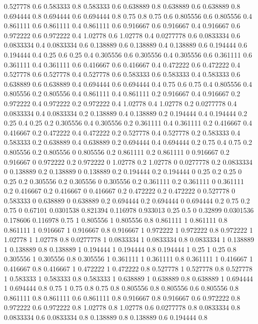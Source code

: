 0.527778 0.6
0.583333 0.8
0.583333 0.6
0.638889 0.8
0.638889 0.6
0.638889 0.8
0.694444 0.8
0.694444 0.6
0.694444 0.8
0.75 0.8
0.75 0.6
0.805556 0.6
0.805556 0.4
0.861111 0.6
0.861111 0.4
0.861111 0.6
0.916667 0.6
0.916667 0.4
0.916667 0.6
0.972222 0.6
0.972222 0.4
1.02778 0.6
1.02778 0.4
0.0277778 0.6
0.0833334 0.6
0.0833334 0.4
0.0833334 0.6
0.138889 0.6
0.138889 0.4
0.138889 0.6
0.194444 0.6
0.194444 0.4
0.25 0.6
0.25 0.4
0.305556 0.6
0.305556 0.4
0.305556 0.6
0.361111 0.6
0.361111 0.4
0.361111 0.6
0.416667 0.6
0.416667 0.4
0.472222 0.6
0.472222 0.4
0.527778 0.6
0.527778 0.4
0.527778 0.6
0.583333 0.6
0.583333 0.4
0.583333 0.6
0.638889 0.6
0.638889 0.4
0.694444 0.6
0.694444 0.4
0.75 0.6
0.75 0.4
0.805556 0.4
0.805556 0.2
0.805556 0.4
0.861111 0.4
0.861111 0.2
0.916667 0.4
0.916667 0.2
0.972222 0.4
0.972222 0.2
0.972222 0.4
1.02778 0.4
1.02778 0.2
0.0277778 0.4
0.0833334 0.4
0.0833334 0.2
0.138889 0.4
0.138889 0.2
0.194444 0.4
0.194444 0.2
0.25 0.4
0.25 0.2
0.305556 0.4
0.305556 0.2
0.361111 0.4
0.361111 0.2
0.416667 0.4
0.416667 0.2
0.472222 0.4
0.472222 0.2
0.527778 0.4
0.527778 0.2
0.583333 0.4
0.583333 0.2
0.638889 0.4
0.638889 0.2
0.694444 0.4
0.694444 0.2
0.75 0.4
0.75 0.2
0.805556 0.2
0.805556 0
0.805556 0.2
0.861111 0.2
0.861111 0
0.916667 0.2
0.916667 0
0.972222 0.2
0.972222 0
1.02778 0.2
1.02778 0
0.0277778 0.2
0.0833334 0
0.138889 0.2
0.138889 0
0.138889 0.2
0.194444 0.2
0.194444 0
0.25 0.2
0.25 0
0.25 0.2
0.305556 0.2
0.305556 0
0.305556 0.2
0.361111 0.2
0.361111 0
0.361111 0.2
0.416667 0.2
0.416667 0
0.416667 0.2
0.472222 0.2
0.472222 0
0.527778 0
0.583333 0
0.638889 0
0.638889 0.2
0.694444 0.2
0.694444 0
0.694444 0.2
0.75 0.2
0.75 0
0.67101 0.0301538
0.821394 0.116978
0.933013 0.25
0.5 0
0.32899 0.0301536
0.178606 0.116978
0.75 1
0.805556 1
0.805556 0.8
0.861111 1
0.861111 0.8
0.861111 1
0.916667 1
0.916667 0.8
0.916667 1
0.972222 1
0.972222 0.8
0.972222 1
1.02778 1
1.02778 0.8
0.0277778 1
0.0833334 1
0.0833334 0.8
0.0833334 1
0.138889 1
0.138889 0.8
0.138889 1
0.194444 1
0.194444 0.8
0.194444 1
0.25 1
0.25 0.8
0.305556 1
0.305556 0.8
0.305556 1
0.361111 1
0.361111 0.8
0.361111 1
0.416667 1
0.416667 0.8
0.416667 1
0.472222 1
0.472222 0.8
0.527778 1
0.527778 0.8
0.527778 1
0.583333 1
0.583333 0.8
0.583333 1
0.638889 1
0.638889 0.8
0.638889 1
0.694444 1
0.694444 0.8
0.75 1
0.75 0.8
0.75 0.8
0.805556 0.8
0.805556 0.6
0.805556 0.8
0.861111 0.8
0.861111 0.6
0.861111 0.8
0.916667 0.8
0.916667 0.6
0.972222 0.8
0.972222 0.6
0.972222 0.8
1.02778 0.8
1.02778 0.6
0.0277778 0.8
0.0833334 0.8
0.0833334 0.6
0.0833334 0.8
0.138889 0.8
0.138889 0.6
0.194444 0.8
